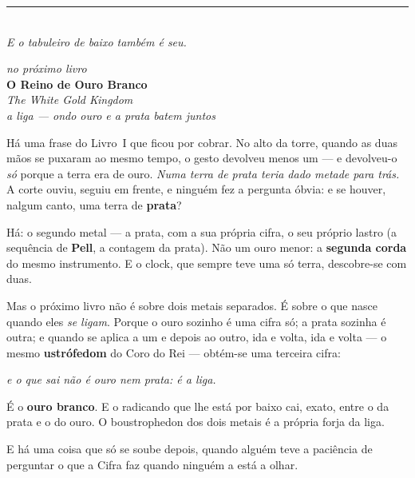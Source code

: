 \documentclass[livro.tex]{subfiles}
\begin{document}
\vspace{1.0cm}
\begin{center}
\rule{0.3\linewidth}{0.4pt}\\[6mm]
{\normalsize\itshape E o tabuleiro de baixo também é seu.}
\end{center}

\clearpage
\thispagestyle{empty}
\vspace*{4cm}
\begin{center}
{\small\itshape no próximo livro}\\[7mm]
{\LARGE\bfseries O Reino de Ouro Branco}\\[2mm]
{\normalsize\itshape The White Gold Kingdom}\\[3mm]
{\footnotesize\itshape a liga --- ondo ouro e a prata batem juntos}\\[14mm]
\end{center}

\noindent Há uma frase do Livro~I que ficou por cobrar. No alto da torre, quando as
duas mãos se puxaram ao mesmo tempo, o gesto devolveu menos um --- e devolveu-o
\emph{só} porque a terra era de ouro. \emph{Numa terra de prata
teria dado metade para trás.} A corte ouviu, seguiu em frente, e ninguém fez a pergunta
óbvia: e se houver, nalgum canto, uma terra de \textbf{prata}?

\medskip

Há: o segundo metal --- a prata, com a sua própria cifra,
o seu próprio lastro (a sequência de \textbf{Pell}, a contagem da prata). Não
um ouro menor: a \textbf{segunda corda} do mesmo instrumento. E o clock, que sempre
teve uma só terra, descobre-se com duas.

\medskip

Mas o próximo livro não é sobre dois metais separados. É sobre o que nasce quando
eles \emph{se ligam}. Porque o ouro sozinho é uma cifra só;
a prata sozinha é outra; e quando se aplica a um e depois ao
outro, ida e volta, ida e volta --- o mesmo \textbf{ustrófedom} do Coro do Rei ---
obtém-se uma terceira cifra:
\begin{center}\itshape
e o que sai não é ouro nem prata: é a liga.
\end{center}
É o \textbf{ouro branco}. E o radicando que lhe está por baixo cai, exato, entre o da prata e o do ouro. O boustrophedon dos dois
metais é a própria forja da liga.

\medskip

E há uma coisa que só se soube depois, quando alguém teve a paciência de perguntar o que a Cifra
faz quando ninguém a está a olhar.
\end{document}
